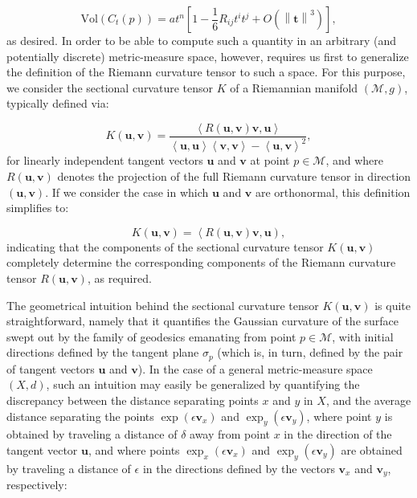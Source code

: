 \documentclass{article}
\begin{document}
\begin{equation}
\mathrm{Vol} \left( C_t \left( p \right) \right) = a t^n \left[ 1 - \frac{1}{6} R_{i j} t^i t^j + O \left( \left\lVert \mathbf{t} \right\rVert^3 \right) \right],
\end{equation}
as desired. In order to be able to compute such a quantity in an arbitrary (and potentially discrete) metric-measure space, however, requires us first to generalize the definition of the Riemann curvature tensor to such a space. For this purpose, we consider the sectional curvature tensor $K$ of a Riemannian manifold ${\left( \mathcal{M}, g \right)}$, typically defined via:

\begin{equation}
K \left( \mathbf{u}, \mathbf{v} \right) = \frac{\left\langle R \left( \mathbf{u}, \mathbf{v} \right) \mathbf{v}, \mathbf{u} \right\rangle}{\left\langle \mathbf{u}, \mathbf{u} \right\rangle \left\langle \mathbf{v}, \mathbf{v} \right\rangle - \left\langle \mathbf{u}, \mathbf{v} \right\rangle^2},
\end{equation}
for linearly independent tangent vectors ${\mathbf{u}}$ and ${\mathbf{v}}$ at point ${p \in \mathcal{M}}$, and where ${R \left( \mathbf{u}, \mathbf{v} \right)}$ denotes the projection of the full Riemann curvature tensor in direction ${\left( \mathbf{u}, \mathbf{v} \right)}$. If we consider the case in which ${\mathbf{u}}$ and ${\mathbf{v}}$ are orthonormal, this definition simplifies to:

\begin{equation}
K \left( \mathbf{u}, \mathbf{v} \right) = \left\langle R \left( \mathbf{u}, \mathbf{v} \right) \mathbf{v}, \mathbf{u} \right),
\end{equation}
indicating that the components of the sectional curvature tensor ${K \left( \mathbf{u}, \mathbf{v} \right)}$ completely determine the corresponding components of the Riemann curvature tensor ${R \left( \mathbf{u}, \mathbf{v} \right)}$, as required.

The geometrical intuition behind the sectional curvature tensor ${K \left( \mathbf{u}, \mathbf{v} \right)}$ is quite straightforward, namely that it quantifies the Gaussian curvature of the surface swept out by the family of geodesics emanating from point ${p \in \mathcal{M}}$, with initial directions defined by the tangent plane ${\sigma_p}$ (which is, in turn, defined by the pair of tangent vectors ${\mathbf{u}}$ and ${\mathbf{v}}$). In the case of a general metric-measure space ${\left( X, d \right)}$, such an intuition may easily be generalized by quantifying the discrepancy between the distance separating points $x$ and $y$ in $X$, and the average distance separating the points ${\exp \left( \epsilon \mathbf{v}_x \right)}$ and ${\exp_y \left( \epsilon \mathbf{v}_y \right)}$, where point $y$ is obtained by traveling a distance of ${\delta}$ away from point $x$ in the direction of the tangent vector ${\mathbf{u}}$, and where points ${\exp_x \left( \epsilon \mathbf{v}_x \right)}$ and ${\exp_y \left( \epsilon \mathbf{v}_y \right)}$ are obtained by traveling a distance of ${\epsilon}$ in the directions defined by the vectors ${\mathbf{v}_x}$ and ${\mathbf{v}_y}$, respectively:
\end{document}
